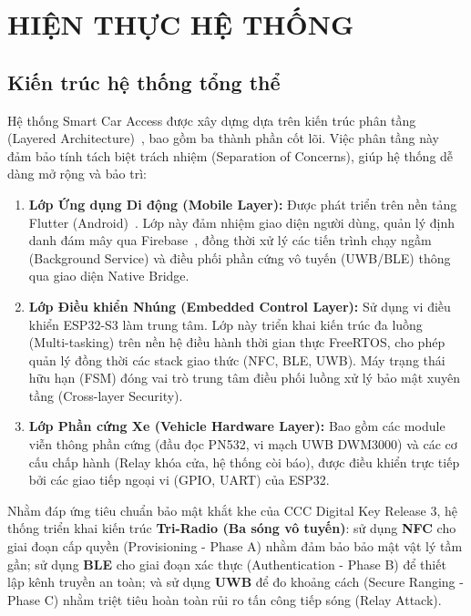 \newpage
\chapter{HIỆN THỰC HỆ THỐNG}













\section{Kiến trúc hệ thống tổng thể}

Hệ thống Smart Car Access được xây dựng dựa trên kiến trúc phân tầng (Layered Architecture)~\cite{richards_arch}, bao gồm ba thành phần cốt lõi. Việc phân tầng này đảm bảo tính tách biệt trách nhiệm (Separation of Concerns), giúp hệ thống dễ dàng mở rộng và bảo trì:

\begin{enumerate}
    \item \textbf{Lớp Ứng dụng Di động (Mobile Layer):} Được phát triển trên nền tảng Flutter (Android)~\cite{flutter_docs}. Lớp này đảm nhiệm giao diện người dùng, quản lý định danh đám mây qua Firebase~\cite{firebase_docs}, đồng thời xử lý các tiến trình chạy ngầm (Background Service) và điều phối phần cứng vô tuyến (UWB/BLE) thông qua giao diện Native Bridge.
    \item \textbf{Lớp Điều khiển Nhúng (Embedded Control Layer):} Sử dụng vi điều khiển ESP32-S3 làm trung tâm. Lớp này triển khai kiến trúc đa luồng (Multi-tasking) trên nền hệ điều hành thời gian thực FreeRTOS, cho phép quản lý đồng thời các stack giao thức (NFC, BLE, UWB). Máy trạng thái hữu hạn (FSM) đóng vai trò trung tâm điều phối luồng xử lý bảo mật xuyên tầng (Cross-layer Security).
    \item \textbf{Lớp Phần cứng Xe (Vehicle Hardware Layer):} Bao gồm các module viễn thông phần cứng (đầu đọc PN532, vi mạch UWB DWM3000) và các cơ cấu chấp hành (Relay khóa cửa, hệ thống còi báo), được điều khiển trực tiếp bởi các giao tiếp ngoại vi (GPIO, UART) của ESP32.
\end{enumerate}

Nhằm đáp ứng tiêu chuẩn bảo mật khắt khe của CCC Digital Key Release 3, hệ thống triển khai kiến trúc \textbf{Tri-Radio (Ba sóng vô tuyến)}: sử dụng \textbf{NFC} cho giai đoạn cấp quyền (Provisioning - Phase A) nhằm đảm bảo bảo mật vật lý tầm gần; sử dụng \textbf{BLE} cho giai đoạn xác thực (Authentication - Phase B) để thiết lập kênh truyền an toàn; và sử dụng \textbf{UWB} để đo khoảng cách (Secure Ranging - Phase C) nhằm triệt tiêu hoàn toàn rủi ro tấn công tiếp sóng (Relay Attack).

